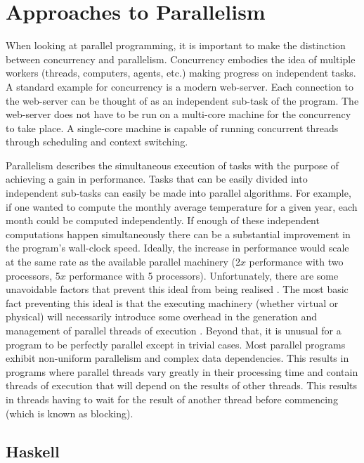 \section{Approaches to Parallelism}

When looking at parallel programming, it is important to make the distinction
between concurrency and parallelism.  Concurrency embodies the idea of multiple
workers (threads, computers, agents, etc.) making progress on independent
tasks. A standard example for concurrency is a modern web-server. Each
connection to the web-server can be thought of as an independent sub-task of
the program. The web-server does not have to be run on a multi-core machine for
the concurrency to take place. A single-core machine is capable of running
concurrent threads through scheduling and context switching.

Parallelism describes the simultaneous execution of tasks with the purpose of
achieving a gain in performance. Tasks that can be easily divided into
independent sub-tasks can easily be made into parallel algorithms. For example,
if one wanted to compute the monthly average temperature for a given year, each
month could be computed independently.  If enough of these independent
computations happen simultaneously there can be a substantial improvement in
the program's wall-clock speed. Ideally, the increase in performance would
scale at the same rate as the available parallel machinery (2$x$ performance
with two processors, 5$x$ performance with 5 processors). Unfortunately, there
are some unavoidable factors that prevent this ideal from being realised
\citep{hughes:thesis,HistoryOfHaskell,PFPAnIntro}. The most basic fact
preventing this ideal is that the executing machinery (whether virtual or
physical) will necessarily introduce some overhead in the generation and
management of parallel threads of execution \citep{PeytonJones:IFL}. Beyond
that, it is unusual for a program to be perfectly parallel except in trivial
cases. Most parallel programs exhibit non-uniform parallelism and complex data
dependencies. This results in programs where parallel threads vary greatly in
their processing time and contain threads of execution that will depend on the
results of other threads. This results in threads having to wait for the result
of another thread before commencing (which is known as blocking).

\subsection{Haskell}

